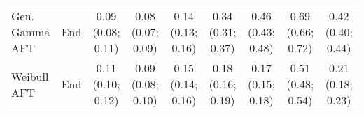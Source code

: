 \begin{table*}[htbp]
\begin{sideways}
\begin{tabular}{llccccccc}
\addlinespace
Gen. Gamma AFT & End & \makecell{0.09\\(0.08; 0.11)} & \makecell{0.08\\(0.07; 0.09)} & \makecell{0.14\\(0.13; 0.16)} & \makecell{0.34\\(0.31; 0.37)} & \makecell{0.46\\(0.43; 0.48)} & \makecell{0.69\\(0.66; 0.72)} & \makecell{0.42\\(0.40; 0.44)} \\
\addlinespace
Weibull AFT & End & \makecell{0.11\\(0.10; 0.12)} & \makecell{0.09\\(0.08; 0.10)} & \makecell{0.15\\(0.14; 0.16)} & \makecell{0.18\\(0.16; 0.19)} & \makecell{0.17\\(0.15; 0.18)} & \makecell{0.51\\(0.48; 0.54)} & \makecell{0.21\\(0.18; 0.23)} \\
\bottomrule
\end{tabular}
\normalsize
\end{sideways}
\end{table*}
